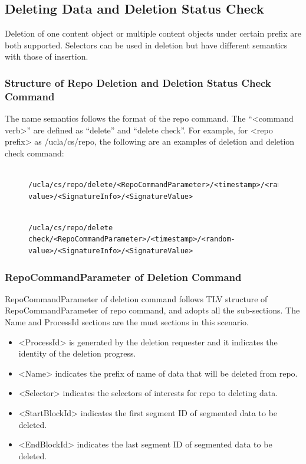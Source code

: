 \documentclass{acm_proc_article-sp}
\begin{document}
\subsection{Deleting Data and Deletion Status Check}
Deletion of one content object or multiple content objects under certain prefix are both supported. Selectors can be used in deletion but have different semantics with those of insertion.

\subsubsection{Structure of Repo Deletion and Deletion Status Check Command}
The name semantics follows the format of the repo command. The ``<command verb>'' are defined as ``delete'' and ``delete check''. For example, for <repo prefix> as /ucla/cs/repo, the following are an examples of deletion and deletion check command:


\begin{figure}
\begin{framed}
\begin{BVerbatim}

/ucla/cs/repo/delete/<RepoCommandParameter>/<timestamp>/<random-value>/<SignatureInfo>/<SignatureValue>

\end{BVerbatim}
\end{framed}
\end{figure}

\begin{figure}
\begin{framed}
\begin{BVerbatim}

/ucla/cs/repo/delete check/<RepoCommandParameter>/<timestamp>/<random-value>/<SignatureInfo>/<SignatureValue>

\end{BVerbatim}
\end{framed}
\end{figure}

\subsubsection{RepoCommandParameter of Deletion Command}
RepoCommandParameter of deletion command follows TLV structure of RepoCommandParameter of repo command, and adopts all the sub-sections. The Name and ProcessId sections are the must sections in this scenario.

\begin{itemize}
\item <ProcessId> is generated by the deletion requester and it indicates the identity of the deletion progress.
\item <Name> indicates the prefix of name of data that will be deleted from repo.
\item <Selector> indicates the selectors of interests for repo to deleting data.
\item <StartBlockId> indicates the first segment ID of segmented data to be deleted.
\item <EndBlockId> indicates the last segment ID of segmented data to be deleted.
\end{itemize}
\end{document}
